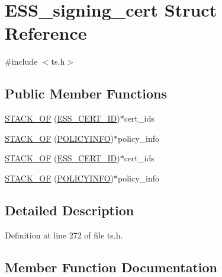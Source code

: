 \hypertarget{struct_e_s_s__signing__cert}{}\section{E\+S\+S\+\_\+signing\+\_\+cert Struct Reference}
\label{struct_e_s_s__signing__cert}


{\ttfamily \#include $<$ts.\+h$>$}

\subsection*{Public Member Functions}
\begin{DoxyCompactItemize}
\item 
\hyperlink{struct_e_s_s__signing__cert_a1a8372e5ad3dc93cb968429981547d86}{S\+T\+A\+C\+K\+\_\+\+OF} (\hyperlink{crypto_2ts_2ts_8h_a21c26fbd080bac20b8b9bd229e5a6681}{E\+S\+S\+\_\+\+C\+E\+R\+T\+\_\+\+ID})$\ast$cert\+\_\+ids
\item 
\hyperlink{struct_e_s_s__signing__cert_a2a62ea7e345af6b0c72229ef775894c8}{S\+T\+A\+C\+K\+\_\+\+OF} (\hyperlink{crypto_2x509v3_2x509v3_8h_a068864dfb1572b706b372d5c29030498}{P\+O\+L\+I\+C\+Y\+I\+N\+FO})$\ast$policy\+\_\+info
\item 
\hyperlink{struct_e_s_s__signing__cert_a1a8372e5ad3dc93cb968429981547d86}{S\+T\+A\+C\+K\+\_\+\+OF} (\hyperlink{crypto_2ts_2ts_8h_a21c26fbd080bac20b8b9bd229e5a6681}{E\+S\+S\+\_\+\+C\+E\+R\+T\+\_\+\+ID})$\ast$cert\+\_\+ids
\item 
\hyperlink{struct_e_s_s__signing__cert_a2a62ea7e345af6b0c72229ef775894c8}{S\+T\+A\+C\+K\+\_\+\+OF} (\hyperlink{crypto_2x509v3_2x509v3_8h_a068864dfb1572b706b372d5c29030498}{P\+O\+L\+I\+C\+Y\+I\+N\+FO})$\ast$policy\+\_\+info
\end{DoxyCompactItemize}


\subsection{Detailed Description}


Definition at line 272 of file ts.\+h.



\subsection{Member Function Documentation}
